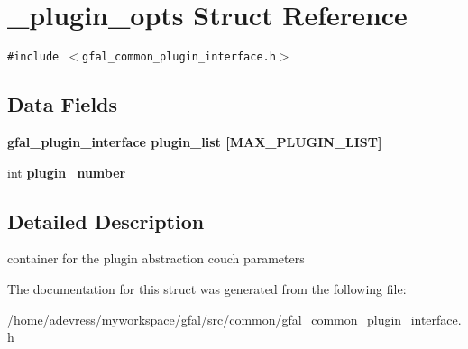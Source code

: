 \section{\_\-plugin\_\-opts Struct Reference}
\label{struct__plugin__opts}
{\tt \#include $<$gfal\_\-common\_\-plugin\_\-interface.h$>$}

\subsection*{Data Fields}
\begin{CompactItemize}
\item 
\bf{gfal\_\-plugin\_\-interface} \textbf{plugin\_\-list} [MAX\_\-PLUGIN\_\-LIST]\label{struct__plugin__opts_aaf10030de179e206f80df2becba58cd}

\item 
int \textbf{plugin\_\-number}\label{struct__plugin__opts_cd39252f5f48e6ba19ca2d2a3be04985}

\end{CompactItemize}


\subsection{Detailed Description}
container for the plugin abstraction couch parameters 



The documentation for this struct was generated from the following file:\begin{CompactItemize}
\item 
/home/adevress/myworkspace/gfal/src/common/gfal\_\-common\_\-plugin\_\-interface.h\end{CompactItemize}
